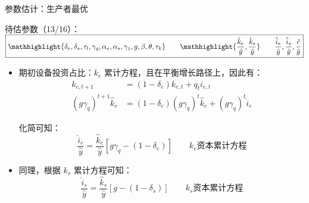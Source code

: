 \documentclass[aspectratio=169,10pt]{beamer}
\begin{document}
\begin{frame}{参数估计：生产者最优}

  \begin{block}{}
    \begin{center}
      待估参数（13/16）：$\boxed{\mathhighlight{
            \delta_e, \delta_s,  \tau_l, \gamma_q,  \alpha_e, \alpha_s, \gamma_z, g, \beta, \theta, \tau_k} \qquad \mathhighlight{\dfrac{\hat{k}_e}{\hat{y}}, \dfrac{\hat{k}_s}{\hat{y}}} \qquad   \dfrac{\hat{i}_e}{\hat{y}}, \dfrac{\hat{i}_s}{\hat{y}}, \dfrac{\hat{c}}{\hat{y}} }$
    \end{center}
  \end{block}

  \begin{itemize}
    \item[12.] 期初设备投资占比：$k_e$ 累计方程，且在平衡增长路径上，因此有：
          \begin{equation*}
            \begin{aligned}
              k_{e,t+1}                 & = (1-\delta_e) k_{e,t} + q_t i_{e,t}                         \\
              (g\gamma_q)^{t+1}\hat k_e & = (1-\delta_e)(g\gamma_q)^t\hat k_e + (g\gamma_q)^t \hat i_e
            \end{aligned}
          \end{equation*}

          化简可知：
          \begin{equation}
            \dfrac{\hat i_e}{\hat y} = \frac{\hat k_e}{\hat y} \left[g\gamma_q-(1-\delta_e)\right] \qquad \boxed{k_e \text{资本累计方程}}
          \end{equation}
    \item[13.] 同理，根据 $k_s$ 累计方程可知：
          \begin{equation}
            \dfrac{\hat i_s}{\hat y} = \frac{\hat k_s}{\hat y} \left[g-(1-\delta_s)\right] \qquad \boxed{k_s \text{资本累计方程}}
          \end{equation}

  \end{itemize}
\end{frame}
\end{document}
